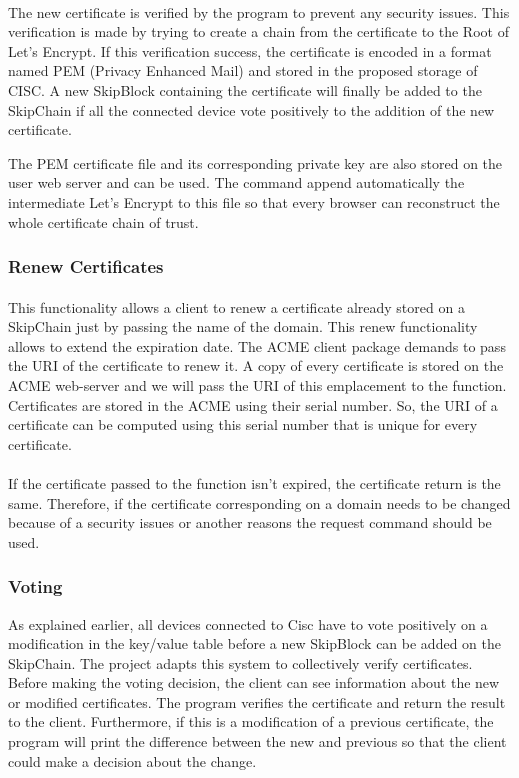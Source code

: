 \documentclass[11pt, a4paper, twoside, openright]{article}
\begin{document}
\paragraph{}
The new certificate is verified by the program to prevent any security issues. This verification is made by trying to create a chain from the certificate to the Root of Let's Encrypt. If this verification success, the certificate is encoded in a format named PEM (Privacy Enhanced Mail) and stored in the proposed storage of CISC. A new SkipBlock containing the certificate will finally be added to the SkipChain if all the connected device vote positively to the addition of the new certificate. 

The PEM certificate file and its corresponding private key are also stored on the user web server and can be used. The command append automatically the intermediate Let's Encrypt to this file so that every browser can reconstruct the whole certificate chain of trust.
\subsubsection{Renew Certificates}
\paragraph{}This functionality allows a client to renew a certificate already stored on a SkipChain just by passing the name of the domain. This renew functionality allows to extend the expiration date. The ACME client package demands to pass the URI of the certificate to renew it. A copy of every certificate is stored on the ACME web-server and we will pass the URI of this emplacement to the function. Certificates are stored in the ACME using their serial number. So, the URI of a certificate can be computed using this serial number that is unique for every certificate. 
\paragraph{}
If the certificate passed to the function isn't expired, the certificate return is the same. Therefore, if the certificate corresponding on a domain needs to be changed because of a security issues or another reasons the request command should be used. 
\subsubsection{Voting}
As explained earlier, all devices connected to Cisc have to vote positively on a modification in the key/value table before a new SkipBlock can be added on the SkipChain. The project adapts this system to collectively verify certificates. Before making the voting decision, the client can see information about the new or modified certificates. The program verifies the certificate and return the result to the client. Furthermore, if this is a modification of a previous certificate, the program will print the difference between the new and previous so that the client could make a decision about the change.          
\end{document}
